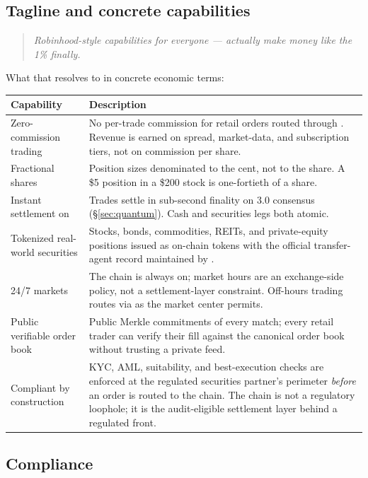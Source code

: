 \subsection{Tagline and concrete capabilities}

\begin{quote}\itshape
Robinhood-style capabilities for everyone --- actually make money like
the 1\% finally.
\end{quote}

What that resolves to in concrete economic terms:

\begin{longtable}{p{4.6cm}p{10cm}}
\toprule
\textbf{Capability} & \textbf{Description} \\
\midrule
\endhead
Zero-commission trading &
   No per-trade commission for retail orders routed through
   \Partner{}. Revenue is earned on spread, market-data, and
   subscription tiers, not on commission per share. \\
Fractional shares &
   Position sizes denominated to the cent, not to the share. A
   \$5 position in a \$200 stock is one-fortieth of a share. \\
Instant settlement on \Quasar{} &
   Trades settle in sub-second finality on \Quasar{} 3.0 consensus
   (\S\ref{sec:quantum}). Cash and securities legs both atomic. \\
Tokenized real-world securities &
   Stocks, bonds, commodities, REITs, and private-equity positions
   issued as on-chain tokens with the official transfer-agent record
   maintained by \Partner{}. \\
24/7 markets &
   The chain is always on; market hours are an exchange-side policy,
   not a settlement-layer constraint. Off-hours trading routes via
   \Partner{} as the market center permits. \\
Public verifiable order book &
   Public Merkle commitments of every match; every retail trader can
   verify their fill against the canonical order book without trusting
   a private feed. \\
Compliant by construction &
   KYC, AML, suitability, and best-execution checks are enforced at
   the regulated securities partner's perimeter \emph{before} an order is routed to the
   chain. The chain is not a regulatory loophole; it is the
   audit-eligible settlement layer behind a regulated front. \\
\bottomrule
\end{longtable}

\subsection{Compliance}


